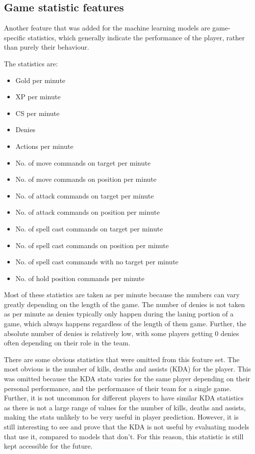 \documentclass[Report.tex]{subfiles}
\begin{document}
\subsection{Game statistic features}
Another feature that was added for the machine learning models are game-specific statistics, which generally indicate the performance of the player, rather than purely their behaviour. 

The statistics are:
\begin{itemize}
\item Gold per minute
\item XP per minute
\item CS per minute
\item Denies
\item Actions per minute
\item No. of move commands on target per minute
\item No. of move commands on position per minute
\item No. of attack commands on target per minute
\item No. of attack commands on position per minute
\item No. of spell cast commands on target per minute
\item No. of spell cast commands on position per minute
\item No. of spell cast commands with no target per minute
\item No. of hold position commands per minute
\end{itemize}
Most of these statistics are taken as per minute because the numbers can vary greatly depending on the length of the game. The number of denies is not taken as per minute as denies typically only happen during the laning portion of a game, which always happens regardless of the length of them game. Further, the absolute number of denies is relatively low, with some players getting 0 denies often depending on their role in the team.

There are some obvious statistics that were omitted from this feature set. The most obvious is the number of kills, deaths and assists (KDA) for the player. This was omitted because the KDA stats varies for the same player depending on their personal performance, and the performance of their team for a single game. Further, it is not uncommon for different players to have similar KDA statistics as there is not a large range of values for the number of kills, deaths and assists, making the stats unlikely to be very useful in player prediction. However, it is still interesting to see and prove that the KDA is not useful by evaluating models that use it, compared to models that don't. For this reason, this statistic is still kept accessible for the future. 
\end{document}
